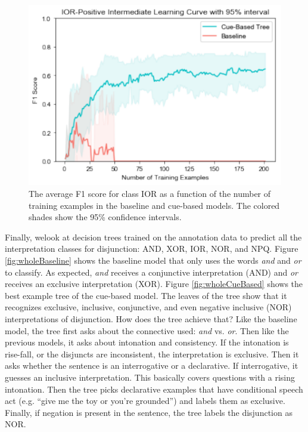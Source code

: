 \documentclass[floatsintext,man]{apa6}
\theoremstyle{definition}
\theoremstyle{definition}
\theoremstyle{definition}
\theoremstyle{remark}
\begin{document}
\begin{figure}
\centering
\includegraphics{figs/IORintermediate-1.pdf}
\caption{\label{fig:IORintermediate}The average F1 score for class IOR as a
function of the number of training examples in the baseline and
cue-based models. The colored shades show the 95\% confidence
intervals.}
\end{figure}

Finally, welook at decision trees trained on the annotation data to
predict all the interpretation classes for disjunction: AND, XOR, IOR,
NOR, and NPQ. Figure \ref{fig:wholeBaseline} shows the baseline model
that only uses the words \emph{and} and \emph{or} to classify. As
expected, \emph{and} receives a conjunctive interpretation (AND) and
\emph{or} receives an exclusive interpretation (XOR). Figure
\ref{fig:wholeCueBased} shows the best example tree of the cue-based
model. The leaves of the tree show that it recognizes exclusive,
inclusive, conjunctive, and even negative inclusive (NOR)
interpretations of disjunction. How does the tree achieve that? Like the
baseline model, the tree first asks about the connective used:
\emph{and} vs. \emph{or}. Then like the previous models, it asks about
intonation and consistency. If the intonation is rise-fall, or the
disjuncts are inconsistent, the interpretation is exclusive. Then it
asks whether the sentence is an interrogative or a declarative. If
interrogative, it guesses an inclusive interpretation. This basically
covers questions with a rising intonation. Then the tree picks
declarative examples that have conditional speech act (e.g.
\enquote{give me the toy or you're grounded}) and labels them as
exclusive. Finally, if negation is present in the sentence, the tree
labels the disjunction as NOR.
\end{document}
